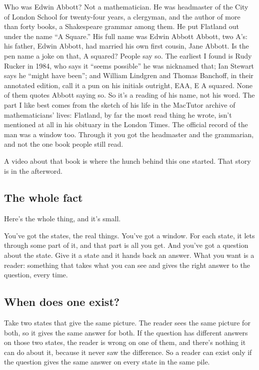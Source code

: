 \documentclass[11pt,twoside]{article}
\theoremstyle{thielethm}
\theoremstyle{thieledef}
\theoremstyle{thieledef}
\theoremstyle{thieledef}
\theoremstyle{thielethm}
\theoremstyle{thieleobs}
\theoremstyle{thielethm}
\begin{document}
Who was Edwin Abbott? Not a mathematician. He was headmaster of the City of London School for twenty-four years, a clergyman, and the author of more than forty books, a Shakespeare grammar among them. He put Flatland out under the name ``A Square.'' His full name was Edwin Abbott Abbott, two A's: his father, Edwin Abbott, had married his own first cousin, Jane Abbott. Is the pen name a joke on that, A squared? People say so. The earliest I found is Rudy Rucker in 1984, who says it ``seems possible'' he was nicknamed that; Ian Stewart says he ``might have been''; and William Lindgren and Thomas Banchoff, in their annotated edition, call it a pun on his initials outright, EAA, E A squared. None of them quotes Abbott saying so. So it's a reading of his name, not his word. The part I like best comes from the sketch of his life in the MacTutor archive of mathematicians' lives: Flatland, by far the most read thing he wrote, isn't mentioned at all in his obituary in the London Times. The official record of the man was a window too. Through it you got the headmaster and the grammarian, and not the one book people still read.

A video about that book is where the hunch behind this one started. That story is in the afterword.

\subsection{The whole fact}

Here's the whole thing, and it's small.

You've got the states, the real things. You've got a window. For each state, it lets through some part of it, and that part is all you get. And you've got a question about the state. Give it a state and it hands back an answer. What you want is a reader: something that takes what you can see and gives the right answer to the question, every time.

\subsection{When does one exist?}

Take two states that give the same picture. The reader sees the same picture for both, so it gives the same answer for both. If the question has different answers on those two states, the reader is wrong on one of them, and there's nothing it can do about it, because it never saw the difference. So a reader can exist only if the question gives the same answer on every state in the same pile.
\end{document}
